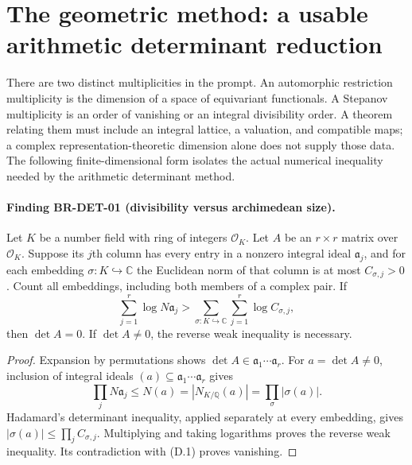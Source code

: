 \documentclass[11pt,a4paper]{article}
\theoremstyle{definition}\newtheorem{definition}[theorem]{Definition}
\theoremstyle{remark}\newtheorem{remark}[theorem]{Remark}
\begin{document}

\section{The geometric method: a usable arithmetic determinant reduction}
\label{sec:root-method}

There are two distinct multiplicities in the prompt.  An automorphic
restriction multiplicity is the dimension of a space of equivariant
functionals.  A Stepanov multiplicity is an order of vanishing or an
integral divisibility order.  A theorem relating them must include an
integral lattice, a valuation, and compatible maps; a complex
representation-theoretic dimension alone does not supply those data.
The following finite-dimensional form isolates the actual numerical
inequality needed by the arithmetic determinant method.

\paragraph{Finding BR-DET-01 (divisibility versus archimedean size).}
Let $K$ be a number field with ring of integers $\mathcal O_K$.
Let $A$ be an $r\times r$ matrix over $\mathcal O_K$.  Suppose its
$j$th column has every entry in a nonzero integral ideal $\mathfrak a_j$,
and for each embedding $\sigma:K\hookrightarrow\mathbb C$ the
Euclidean norm of that column is at most $C_{\sigma,j}>0$.
Count all embeddings, including both members of a complex pair.
If
\[
 \sum_{j=1}^r\log N\mathfrak a_j
   >\sum_{\sigma:K\hookrightarrow\mathbb C}
                     \sum_{j=1}^r\log C_{\sigma,j},             \tag{D.1}
\]
then $\det A=0$.  If $\det A\ne0$, the reverse weak inequality
is necessary.

\begin{proof}
Expansion by permutations shows
$\det A\in\mathfrak a_1\cdots\mathfrak a_r$.
For $a=\det A\ne0$, inclusion of integral ideals
$(a)\subseteq\mathfrak a_1\cdots\mathfrak a_r$ gives
\[
 \prod_jN\mathfrak a_j
 \leq N(a)=|N_{K/\mathbb Q}(a)|
 =\prod_\sigma|\sigma(a)|.
\]
Hadamard's determinant inequality, applied separately at every
embedding, gives
$|\sigma(a)|\leq\prod_j C_{\sigma,j}$.
Multiplying and taking logarithms proves the reverse weak
inequality.  Its contradiction with (D.1) proves vanishing.
\end{proof}
\end{document}
